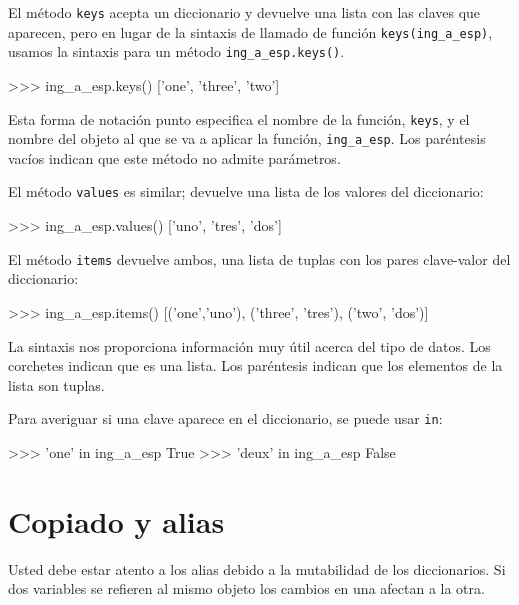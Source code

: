   
 

El método \texttt{keys} acepta un diccionario y devuelve una lista
con las claves que aparecen, pero en lugar de la sintaxis de llamado
de función \texttt{keys(ing\_a\_esp)}, usamos la sintaxis para un
método \texttt{ing\_a\_esp.keys()}.


\begin{pyconcode}
>>> ing_a_esp.keys()
['one', 'three', 'two']
\end{pyconcode}
 Esta forma de notación punto especifica el nombre de la función,
\texttt{keys}, y el nombre del objeto al que se va a aplicar la función,
\texttt{ing\_a\_esp}. Los paréntesis vacíos indican que este método
no admite parámetros.

El método \texttt{values} es similar; devuelve una lista de los valores
del diccionario:
\begin{pyconcode}
>>> ing_a_esp.values()
['uno', 'tres', 'dos']
\end{pyconcode}

El método \texttt{items} devuelve ambos, una lista de tuplas con los
pares clave-valor del diccionario:
\begin{pyconcode}
>>> ing_a_esp.items()
[('one','uno'), ('three', 'tres'), ('two', 'dos')]
\end{pyconcode}

La sintaxis nos proporciona información muy útil acerca del tipo de
datos. Los corchetes indican que es una lista. Los paréntesis indican
que los elementos de la lista son tuplas.

Para averiguar si una clave aparece en el diccionario, se puede usar
\texttt{in}:
\begin{pyconcode}
>>> 'one' in ing_a_esp
True
>>> 'deux' in ing_a_esp
False
\end{pyconcode}


\section{Copiado y alias}

  

Usted debe estar atento a los alias debido a la mutabilidad de los
diccionarios. Si dos variables se refieren al mismo objeto los cambios
en una afectan a la otra.

